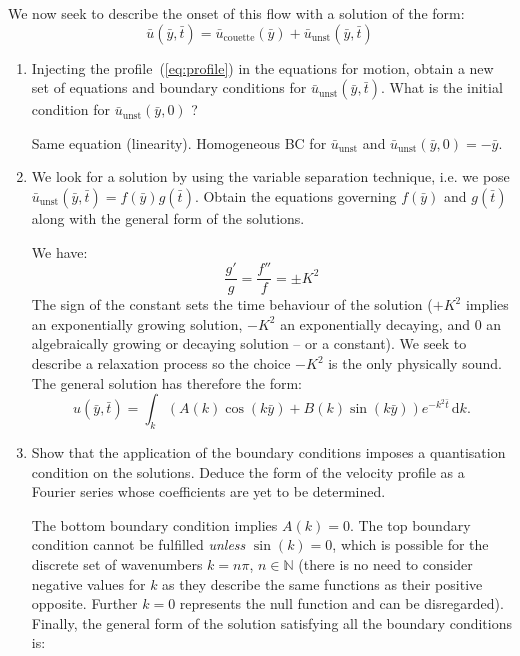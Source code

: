 \documentclass[11pt,a4paper]{article}
\begin{document}
\noindent We now seek to describe the onset of this flow with a solution of the form:
\begin{equation}
\bar u(\bar y,\bar t) = \bar u_\text{couette}(\bar y) + \bar u_\text{unst}(\bar y,\bar t)
\label{eq:profile}
\end{equation}
\begin{enumerate}[resume]
    \item Injecting the profile~(\ref{eq:profile}) in the equations for motion, obtain a new set of equations and boundary conditions for $\bar u_\text{unst}(\bar y,\bar t)$. What is the initial condition for  $\bar u_\text{unst}(\bar y,0)$ ? 
    \begin{answer}
    Same equation (linearity). Homogeneous BC for $\bar u_\text{unst}$ and $\bar u_\text{unst}(\bar y,0) = -\bar y$.
    \end{answer}
    \item We look for a solution by using the variable separation technique, i.e. we pose $\bar u_\text{unst}(\bar y,\bar t) = f(\bar y)g(\bar t)$. Obtain the equations governing $f(\bar y)$ and $g(\bar t)$ along with the general form of the solutions.
\begin{answer}
We have:
$$
\frac{g'}{g} = \frac{f''}{f} = \pm K^2
$$
The sign of the constant sets the time behaviour of the solution ($+K^2$ implies an exponentially growing solution, $-K^2$ an exponentially decaying, and 0 an algebraically growing or decaying solution -- or a constant). We seek to describe a relaxation process so the choice $-K^2$ is the only physically sound. The general solution has therefore the form:
$$
u(\bar y,\bar t) = \int_k \left(A(k) \cos(k \bar y) + B(k) \sin(k \bar y)\right) e^{-k^2 \bar t} \, \mathrm dk.
$$
\end{answer}
    \item Show that the application of the boundary conditions imposes a quantisation condition on the solutions. Deduce the form of the velocity profile as a Fourier series whose coefficients are yet to be determined.
\begin{answer}
The bottom boundary condition implies $A(k) = 0$. The top boundary condition cannot be fulfilled \textit{unless} $\sin(k) = 0$, which is possible for the discrete set of wavenumbers $k = n\pi$, $n \in \mathbb{N}$ (there is no need to consider negative values for $k$ as they describe the same functions as their positive opposite. Further $k=0$ represents the null function and can be disregarded). Finally, the general form of the solution satisfying all the boundary conditions is:

\end{answer}
\end{enumerate}
\end{document}
